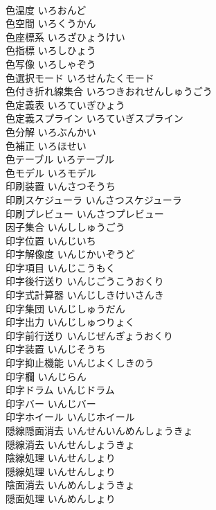\documentclass[8pt]{extreport}
\begin{document}
\begin{CJK}{UTF8}{min}
\\	色温度	いろおんど	
\\	色空間	いろくうかん	
\\	色座標系	いろざひょうけい	
\\	色指標	いろしひょう	
\\	色写像	いろしゃぞう	
\\	色選択モード	いろせんたくモード	
\\	色付き折れ線集合	いろつきおれせんしゅうごう	
\\	色定義表	いろていぎひょう	
\\	色定義スプライン	いろていぎスプライン	
\\	色分解	いろぶんかい	
\\	色補正	いろほせい	
\\	色テーブル	いろテーブル	
\\	色モデル	いろモデル	
\\	印刷装置	いんさつそうち	
\\	印刷スケジューラ	いんさつスケジューラ	
\\	印刷プレビュー	いんさつプレビュー	
\\	因子集合	いんししゅうごう	
\\	印字位置	いんじいち	
\\	印字解像度	いんじかいぞうど	
\\	印字項目	いんじこうもく	
\\	印字後行送り	いんじごうこうおくり	
\\	印字式計算器	いんじしきけいさんき	
\\	印字集団	いんじしゅうだん	
\\	印字出力	いんじしゅつりょく	
\\	印字前行送り	いんじぜんぎょうおくり	
\\	印字装置	いんじそうち	
\\	印字抑止機能	いんじよくしきのう	
\\	印字欄	いんじらん	
\\	印字ドラム	いんじドラム	
\\	印字バー	いんじバー	
\\	印字ホイール	いんじホイール	
\\	隠線隠面消去	いんせんいんめんしょうきょ	
\\	隠線消去	いんせんしょうきょ	
\\	陰線処理	いんせんしょり	
\\	隠線処理	いんせんしょり	
\\	陰面消去	いんめんしょうきょ	
\\	隠面処理	いんめんしょり	

\end{CJK}
\end{document}
